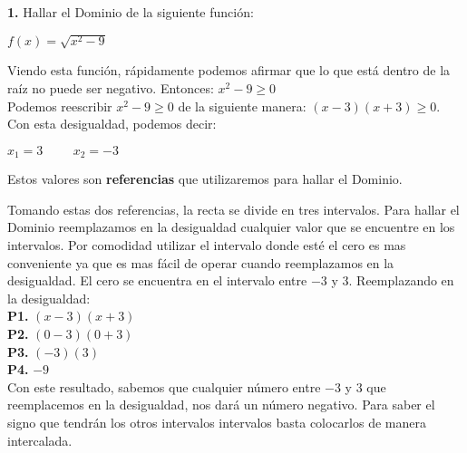 \documentclass[12pt,a4paper]{book}
\newcommand*\ruleline[1]{\par\noindent\raisebox{.8ex}{\makebox[\linewidth]{\hrulefill\hspace{1ex}\raisebox{-.8ex}{#1}\hspace{1ex}\hrulefill}}}
\begin{document}
{{\ruleline{\textbf{Ejemplos}}
\textbf{1.} Hallar el Dominio de la siguiente función:

\begin{center}
$f(x)=\sqrt{x^2 - 9}$
\end{center}
Viendo esta función, rápidamente podemos afirmar que lo que está dentro de la raíz no puede ser negativo. Entonces: $x^2 - 9 \geq 0$\\${ }$\\
Podemos reescribir $x^2-9\geq 0$ de la siguiente manera: $(x-3)(x+3)\geq 0$. Con esta desigualdad, podemos decir:
\begin{center}
$x_1=3 \hspace{1cm} x_2=-3$
\end{center}
Estos valores son \textbf{referencias} que utilizaremos para hallar el Dominio.\vspace{1cm}

\begin{center}
\end{center}
Tomando estas dos referencias, la recta se divide en tres intervalos. Para hallar el Dominio reemplazamos en la desigualdad cualquier valor que se encuentre en los intervalos. Por comodidad utilizar el intervalo donde esté el cero es mas conveniente ya que es mas fácil de operar cuando reemplazamos en la desigualdad. El cero se encuentra en el intervalo entre $-3$ y $3$. Reemplazando en la desigualdad:\\${ }$\\
\textbf{P1.} $(x-3)(x+3)$\\
\textbf{P2.} $(0-3)(0+3)$\\
\textbf{P3.} $(-3)(3)$\\
\textbf{P4.} $-9$\\${ }$\\
Con este resultado, sabemos que cualquier número entre $-3$ y $3$ que reemplacemos en la desigualdad, nos dará un número negativo. Para saber el signo que tendrán los otros intervalos intervalos basta colocarlos de manera intercalada.

}}
\end{document}
